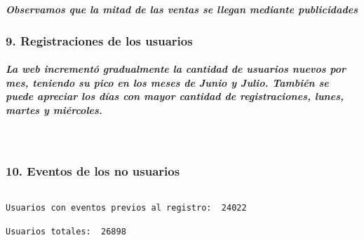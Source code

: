 \documentclass[11pt]{article}
\begin{document}
    
    \begin{center}
    \end{center}

    \hypertarget{observamos-que-la-mitad-de-las-ventas-se-llegan-mediante-publicidades}{%
\subparagraph{Observamos que la mitad de las ventas se llegan mediante
publicidades}\label{observamos-que-la-mitad-de-las-ventas-se-llegan-mediante-publicidades}}

    \hypertarget{registraciones-de-los-usuarios}{%
\subsubsection{9. Registraciones de los
usuarios}\label{registraciones-de-los-usuarios}}

   
    \begin{center}
    \end{center}
 
    \hypertarget{la-web-incrementuxf3-gradualmente-la-cantidad-de-usuarios-nuevos-por-mes-teniendo-su-pico-en-los-meses-de-junio-y-julio.-tambiuxe9n-se-puede-apreciar-los-duxedas-con-mayor-cantidad-de-registraciones-lunes-martes-y-miuxe9rcoles.}{%
\subparagraph{La web incrementó gradualmente la cantidad de usuarios
nuevos por mes, teniendo su pico en los meses de Junio y Julio. También
se puede apreciar los días con mayor cantidad de registraciones, lunes,
martes y
miércoles.}\label{la-web-incrementuxf3-gradualmente-la-cantidad-de-usuarios-nuevos-por-mes-teniendo-su-pico-en-los-meses-de-junio-y-julio.-tambiuxe9n-se-puede-apreciar-los-duxedas-con-mayor-cantidad-de-registraciones-lunes-martes-y-miuxe9rcoles.}}

    \begin{center}
    \end{center}
    { \hspace*{\fill} \\}
    
    \hypertarget{eventos-de-los-no-usuarios}{%
\subsubsection{10. Eventos de los no
usuarios}\label{eventos-de-los-no-usuarios}}


    \begin{Verbatim}[commandchars=\\\{\}]
    
Usuarios con eventos previos al registro:  24022 

Usuarios totales:  26898
    \end{Verbatim}
\end{document}
